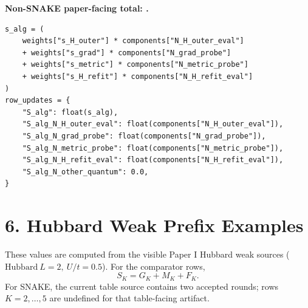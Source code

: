 \documentclass[10pt,twocolumn]{article}
\begin{document}
\textbf{\footnotesize Non-SNAKE paper-facing total:
.}
\begin{lstlisting}
s_alg = (
    weights["s_H_outer"] * components["N_H_outer_eval"]
    + weights["s_grad"] * components["N_grad_probe"]
    + weights["s_metric"] * components["N_metric_probe"]
    + weights["s_H_refit"] * components["N_H_refit_eval"]
)
row_updates = {
    "S_alg": float(s_alg),
    "S_alg_N_H_outer_eval": float(components["N_H_outer_eval"]),
    "S_alg_N_grad_probe": float(components["N_grad_probe"]),
    "S_alg_N_metric_probe": float(components["N_metric_probe"]),
    "S_alg_N_H_refit_eval": float(components["N_H_refit_eval"]),
    "S_alg_N_other_quantum": 0.0,
}
\end{lstlisting}

\section*{6. Hubbard Weak Prefix Examples}

These values are computed from the visible Paper I Hubbard weak sources
(\(\mathrm{Hubbard}\ L=2,\ U/t=0.5\)).  For the comparator rows,
\[
  S_K=G_K+M_K+F_K.
\]
For SNAKE, the current table source contains two accepted rounds; rows
\(K=2,\ldots,5\) are undefined for that table-facing artifact.
\end{document}

